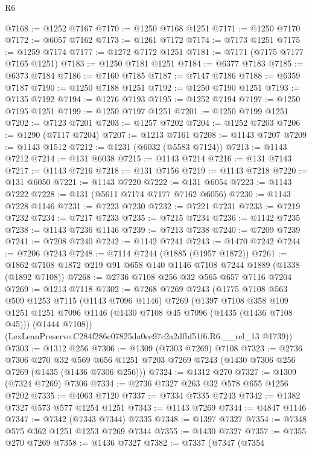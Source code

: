 \begin{lexlean}{R6}
\begin{coremodule}
@7168 := @1252 @7167
@7170 := @1250 @7168 @1251
@7171 := @1250 @7170
@7172 := @6057 @7162
@7173 := @1261 @7172
@7174 := @7173 @1251
@7175 := @1259 @7174
@7177 := @1272 @7172 @1251
@7181 := @7171 (@7175 @7177 @7165 @1251)
@7183 := @1250 @7181 @1251
@7184 := @6377 @7183
@7185 := @6373 @7184
@7186 := @7160 @7185
@7187 := @7147 @7186
@7188 := @6359 @7187
@7190 := @1250 @7188 @1251
@7192 := @1250 @7190 @1251
@7193 := @7135 @7192
@7194 := @1276 @7193
@7195 := @1252 @7194
@7197 := @1250 @7195 @1251
@7199 := @1250 @7197 @1251
@7201 := @1250 @7199 @1251
@7202 := @7123 @7201
@7203 := @1257 @7202
@7204 := @1252 @7203
@7206 := @1290 (@7117 @7204)
@7207 := @1213 @7161
@7208 := @1143 @7207
@7209 := @1143 @1512
@7212 := @1231 (@6032 (@5583 @7124))
@7213 := @1143 @7212
@7214 := @131 @6038
@7215 := @1143 @7214
@7216 := @131 @7143
@7217 := @1143 @7216
@7218 := @131 @7156
@7219 := @1143 @7218
@7220 := @131 @6050
@7221 := @1143 @7220
@7222 := @131 @6054
@7223 := @1143 @7222
@7228 := @131 (@5611 @7174 @7177 @7162 @6056)
@7230 := @1143 @7228 @1146
@7231 := @7223 @7230
@7232 := @7221 @7231
@7233 := @7219 @7232
@7234 := @7217 @7233
@7235 := @7215 @7234
@7236 := @1142 @7235
@7238 := @1143 @7236 @1146
@7239 := @7213 @7238
@7240 := @7209 @7239
@7241 := @7208 @7240
@7242 := @1142 @7241
@7243 := @1470 @7242
@7244 := @7206 @7243
@7248 := @7114 @7244 (@1885 (@1957 @1872))
@7261 := @1862 @7108 @1872 @219 @91 @658 @140 @1146 @7108 @7244 @1889 (@1338 (@1892 @7108))
@7268 := @2736 @7108 @256 @32 @565 @657 @7116 @7204
@7269 := @1213 @7118
@7302 := @7268
    @7269
    @7243
    (@1775
      @7108
      @563
      @509
      @1253
      @7115
      (@1143 @7096 @1146)
      @7269
      (@1397
        @7108
        @358
        @109
        @1251
        @1251
        @7096
        @1146
        (@1430 @7108 @45 @7096 (@1435 (@1436 @7108 @45)))
        (@1444 @7108))
      (LexLeanPreserve.C284f286c07825da0ee97c2a2dfbf51f6.R6.__rel_13 @1739))
@7303 := @1312 @256
@7306 := @1309 (@7303 @7269) @7108
@7323 := @2736
    @7306
    @270
    @32
    @569
    @656
    @1251
    @7203
    @7269
    @7243
    (@1430 @7306 @256 @7269 (@1435 (@1436 @7306 @256)))
@7324 := @1312 @270
@7327 := @1309 (@7324 @7269) @7306
@7334 := @2736 @7327 @263 @32 @578 @655 @1256 @7202
@7335 := @4063 @7120
@7337 := @7334 @7335 @7243
@7342 := @1382 @7327 @573 @577 @1254 @1251
@7343 := @1143 @7269
@7344 := @4847 @1146
@7347 := @7342 (@7343 @7344) @7335
@7348 := @1397 @7327
@7354 := @7348 @575 @362 @1251 @1253 @7269 @7344
@7355 := @1430 @7327
@7357 := @7355 @270 @7269
@7358 := @1436 @7327
@7382 := @7337
    (@7347
      (@7354

\end{coremodule}
\end{lexlean}
